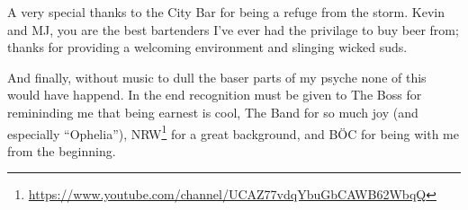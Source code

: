 A very special thanks to the City Bar for being a refuge from the storm. Kevin and MJ, you are the best bartenders I've ever had the privilage to buy beer from; thanks for providing a welcoming environment and slinging wicked suds.

And finally, without music to dull the baser parts of my psyche none of this would have happend. In the end recognition must be given to The Boss for remininding me that being earnest is cool, The Band for so much joy (and especially ``Ophelia''), NRW\footnote{\url{https://www.youtube.com/channel/UCAZ77vdqYbuGbCAWB62WbqQ}} for a great background, and B{\"O}C for being with me from the beginning.

